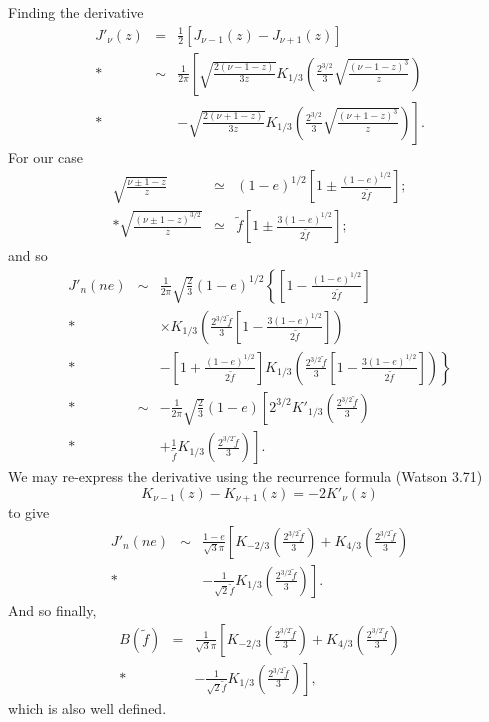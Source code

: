 \documentclass[aps,prd,reprint,showpacs,groupedaddress]{revtex4-1}
\newcommand{\recip}[1]{\ensuremath{\frac{1}{#1}}}
\begin{document}
Finding the derivative
\begin{eqnarray}
J'_\nu(z) & = & \recip{2}\left[J_{\nu-1}(z) - J_{\nu+1}(z)\right] \nonumber \\*
 & \sim & \recip{2\pi}\left[\sqrt{\frac{2(\nu -1 - z)}{3z}}K_{1/3}\left(\frac{2^{3/2}}{3}\sqrt{\frac{(\nu - 1 - z)^3}{z}}\right) \right. \nonumber \\*
 & & \left. - \sqrt{\frac{2(\nu +1 - z)}{3z}}K_{1/3}\left(\frac{2^{3/2}}{3}\sqrt{\frac{(\nu + 1 - z)^3}{z}}\right)\right].
\end{eqnarray}
For our case
\begin{eqnarray}
\sqrt{\frac{\nu \pm 1 - z}{z}} & \simeq & (1 - e)^{1/2}\left[1 \pm \frac{(1-e)^{1/2}}{2\tilde{f}}\right];\\*
\sqrt{\frac{(\nu \pm 1 - z)^{3/2}}{z}} & \simeq & \tilde{f}\left[1 \pm \frac{3(1-e)^{1/2}}{2\tilde{f}}\right];
\end{eqnarray}
and so
\begin{eqnarray}
J'_n(ne) & \sim & \recip{2\pi}\sqrt{\frac{2}{3}}(1-e)^{1/2}\left\{\left[1 - \frac{(1-e)^{1/2}}{2\tilde{f}}\right] \right. \nonumber \\*
 & & \times K_{1/3}\left(\frac{2^{3/2}\tilde{f}}{3}\left[1 - \frac{3(1-e)^{1/2}}{2\tilde{f}}\right]\right) \nonumber \\*
 & & \left. - \left[1 + \frac{(1-e)^{1/2}}{2\tilde{f}}\right]K_{1/3}\left(\frac{2^{3/2}\tilde{f}}{3}\left[1 - \frac{3(1-e)^{1/2}}{2\tilde{f}}\right]\right)\right\}\nonumber \\*
 & \sim & -\frac{1}{2\pi}\sqrt{\frac{2}{3}}(1-e)\left[2^{3/2}K'_{1/3}\left(\frac{2^{3/2}\tilde{f}}{3}\right) \right. \nonumber \\*
 & & \left. + \recip{\tilde{f}}K_{1/3}\left(\frac{2^{3/2}\tilde{f}}{3}\right)\right].
\end{eqnarray}
We may re-express the derivative using the recurrence formula (Watson\cite{Watson1995} 3.71)
\begin{equation}
K_{\nu-1}(z) - K_{\nu+1}(z) = -2K'_\nu(z)
\end{equation}
to give
\begin{eqnarray}
J'_n(ne) & \sim & \frac{1-e}{\sqrt{3}\pi}\left[K_{-2/3}\left(\frac{2^{3/2}\tilde{f}}{3}\right) + K_{4/3}\left(\frac{2^{3/2}\tilde{f}}{3}\right) \right. \nonumber \\*
 & & \left. - \recip{\sqrt{2}\tilde{f}}K_{1/3}\left(\frac{2^{3/2}\tilde{f}}{3}\right)\right].
\end{eqnarray}
And so finally,
\begin{eqnarray}
B(\tilde{f}) & = & \recip{\sqrt{3}\pi}\left[K_{-2/3}\left(\frac{2^{3/2}\tilde{f}}{3}\right) + K_{4/3}\left(\frac{2^{3/2}\tilde{f}}{3}\right) \right. \nonumber \\*
 & & \left. - \recip{\sqrt{2}\tilde{f}}K_{1/3}\left(\frac{2^{3/2}\tilde{f}}{3}\right)\right],
\end{eqnarray}
which is also well defined.
\end{document}
